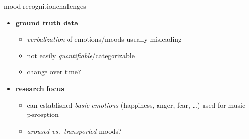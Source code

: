         \begin{frame}{mood recognition}{challenges}
            \begin{itemize}
                \item   \textbf{ground truth data}
                    \begin{itemize}
                        \item   \textit{verbalization} of emotions/moods usually misleading
                        \item   not easily \textit{quantifiable}/categorizable
                        \item   change over time?
                    \end{itemize}
                \bigskip
                \item   \textbf{research focus}
                    \begin{itemize}
                        \item<2->	can established \textit{basic emotions} (happiness, anger, fear, \ldots) used for music perception
                        \item<3->	\textit{aroused vs.\ transported} moods?
                    \end{itemize}
            \end{itemize}
        \end{frame}
                
